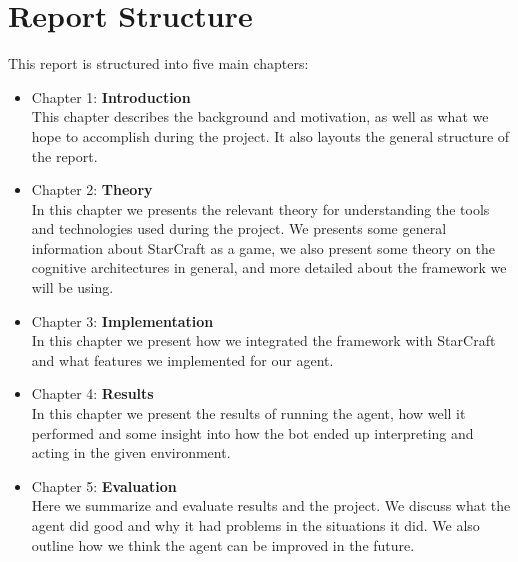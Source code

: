 \section{Report Structure}
\label{sec:structure}
This report is structured into five main chapters:
\begin{itemize}
\item Chapter 1: \textbf{Introduction} \\
This chapter describes the background and motivation, as well as what we hope to accomplish during the project. It also layouts the general structure of the report.
\item Chapter 2: \textbf{Theory} \\
In this chapter we presents the relevant theory for understanding the tools and technologies used during the project. We presents some general information about StarCraft as a game, we also present some theory on the cognitive architectures in general, and more detailed about the framework we will be using. 
\item Chapter 3: \textbf{Implementation} \\
In this chapter we present how we integrated the framework with StarCraft and what features we implemented for our agent.
\item Chapter 4: \textbf{Results} \\
In this chapter we present the results of running the agent, how well it performed and some insight into how the bot ended up interpreting and acting in the given environment. 
\item Chapter 5: \textbf{Evaluation} \\
Here we summarize and evaluate results and the project. We discuss what the agent did good and why it had problems in the situations it did. We also outline how we think the agent can be improved in the future. 

\end{itemize}